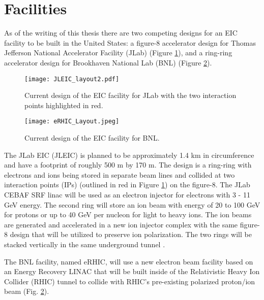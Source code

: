 \section{Facilities}
As of the writing of this thesis there are two competing designs for an EIC facility to be built in the United States: a figure-8 accelerator design for Thomas Jefferson National Accelerator Facility (JLab) (Figure \ref{fig:jleic_layout}), and a ring-ring accelerator design for Brookhaven National Lab (BNL) (Figure \ref{fig:erhic_layout}).

\begin{figure}[ht]
	\centering
	\texttt{[image: JLEIC\_layout2.pdf]}
	\caption{Current design of the EIC facility for JLab with the two interaction points highlighted in red.}
	\label{fig:jleic_layout}
\end{figure}

\begin{figure}[ht]
	\centering
	\texttt{[image: eRHIC\_Layout.jpeg]}
	\caption{Current design of the EIC facility for BNL.}
	\label{fig:erhic_layout}
\end{figure}

The JLab EIC (JLEIC) is planned to be approximately 1.4 km in circumference and have a footprint of roughly 500 m by 170 m. The design is a ring-ring with electrons and ions being stored in separate beam lines and collided at two interaction points  (IPs) (outlined in red in Figure \ref{fig:jleic_layout}) on the figure-8. The JLab CEBAF SRF linac will be used as an electron injector for electrons with 3 - 11 GeV energy. The second ring will store an ion beam with energy of 20 to 100 GeV for protons or up to 40 GeV per nucleon for light to heavy ions. The ion beams are generated and accelerated in a new ion injector complex with the same figure-8 design that will be utilized to preserve ion polarization. The two rings will be stacked vertically in the same underground tunnel \cite{JLEICdesign}.

The BNL facility, named eRHIC, will use a new electron beam facility based on an Energy Recovery LINAC that will be built inside of the Relativistic Heavy Ion Collider (RHIC) tunnel to collide with RHIC's pre-existing polarized proton/ion beam (Fig. \ref{fig:erhic_layout}). 

